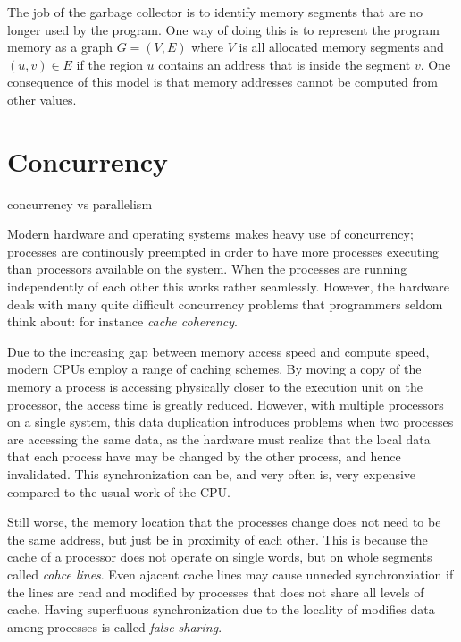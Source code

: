 The job of the garbage collector is to identify memory segments that are no longer used by the
program. One way of doing this is to represent the program memory as a graph $G=(V, E)$ where $V$ is
all allocated memory segments and $(u, v) \in E$ if the region $u$ contains an address that is
inside the segment $v$. One consequence of this model is that memory addresses cannot be computed
from other values.





\section{Concurrency}

concurrency vs parallelism


Modern hardware and operating systems makes heavy use of concurrency; processes are continously
preempted in order to have more processes executing than processors available on the system.  When
the processes are running independently of each other this works rather seamlessly.  However, the
hardware deals with many quite difficult concurrency problems that programmers seldom think about:
for instance \emph{cache coherency}.

Due to the increasing gap between memory access speed and compute speed, modern CPUs employ a range
of caching schemes. By moving a copy of the memory a process is accessing physically closer to the
execution unit on the processor, the access time is greatly reduced. However, with multiple
processors on a single system, this data duplication introduces problems when two processes are
accessing the same data, as the hardware must realize that the local data that each process have
may be changed by the other process, and hence invalidated. This synchronization can be, and very
often is, very expensive compared to the usual work of the CPU\@.

Still worse, the memory location that the processes change does not need to be the same address,
but just be in proximity of each other. This is because the cache of a processor does not operate
on single words, but on whole segments called \emph{cahce lines}. Even ajacent cache lines may
cause unneded synchronziation if the lines are read and modified by processes that does not share
all levels of cache. Having superfluous synchronization due to the locality of modifies data among
processes is called \emph{false sharing}.


